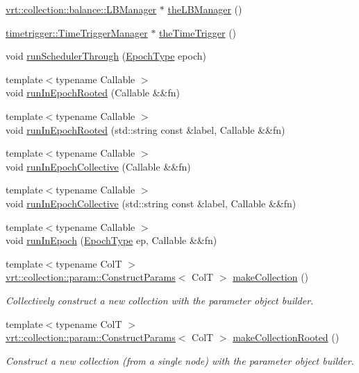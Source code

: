 \begin{DoxyCompactItemize}
\item 
\hyperlink{structvt_1_1vrt_1_1collection_1_1balance_1_1_l_b_manager}{vrt\+::collection\+::balance\+::\+L\+B\+Manager} $\ast$ \hyperlink{namespacevt_a05187076eac8c66c9951b062b0955520}{the\+L\+B\+Manager} ()
\item 
\hyperlink{structvt_1_1timetrigger_1_1_time_trigger_manager}{timetrigger\+::\+Time\+Trigger\+Manager} $\ast$ \hyperlink{namespacevt_a1e1a39cdf2a3fc1adefcdfcca4716bf2}{the\+Time\+Trigger} ()
\item 
void \hyperlink{namespacevt_aa550774c1c9c668176ce535fd7d58fb0}{run\+Scheduler\+Through} (\hyperlink{namespacevt_a81d11b28122d43bf9834577e4a06440f}{Epoch\+Type} epoch)
\item 
{\footnotesize template$<$typename Callable $>$ }\\void \hyperlink{namespacevt_a9f5cbbc484d7f14f2ad0ee46d62dfb6e}{run\+In\+Epoch\+Rooted} (Callable \&\&fn)
\item 
{\footnotesize template$<$typename Callable $>$ }\\void \hyperlink{namespacevt_af80867582a504d0f3cf4e2d95596645b}{run\+In\+Epoch\+Rooted} (std\+::string const \&label, Callable \&\&fn)
\item 
{\footnotesize template$<$typename Callable $>$ }\\void \hyperlink{namespacevt_a2fc4ef34f30b49a1781d765804bfadbb}{run\+In\+Epoch\+Collective} (Callable \&\&fn)
\item 
{\footnotesize template$<$typename Callable $>$ }\\void \hyperlink{namespacevt_aa6f98f3a207d6d329cf36cbd6d523626}{run\+In\+Epoch\+Collective} (std\+::string const \&label, Callable \&\&fn)
\item 
{\footnotesize template$<$typename Callable $>$ }\\void \hyperlink{namespacevt_ab95230c4145a8f4fb6874188eda37991}{run\+In\+Epoch} (\hyperlink{namespacevt_a81d11b28122d43bf9834577e4a06440f}{Epoch\+Type} ep, Callable \&\&fn)
\item 
{\footnotesize template$<$typename ColT $>$ }\\\hyperlink{structvt_1_1vrt_1_1collection_1_1param_1_1_construct_params}{vrt\+::collection\+::param\+::\+Construct\+Params}$<$ ColT $>$ \hyperlink{namespacevt_a95c0d739e465e5324c2383f43ab2a145}{make\+Collection} ()
\begin{DoxyCompactList}\small\item\em Collectively construct a new collection with the parameter object builder. \end{DoxyCompactList}\item 
{\footnotesize template$<$typename ColT $>$ }\\\hyperlink{structvt_1_1vrt_1_1collection_1_1param_1_1_construct_params}{vrt\+::collection\+::param\+::\+Construct\+Params}$<$ ColT $>$ \hyperlink{namespacevt_a37806a29a810adceb5792f7cfd4de106}{make\+Collection\+Rooted} ()
\begin{DoxyCompactList}\small\item\em Construct a new collection (from a single node) with the parameter object builder. \end{DoxyCompactList}\end{DoxyCompactItemize}
